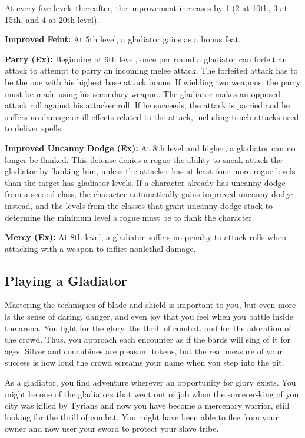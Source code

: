 At every five levels thereafter, the improvement increases by 1 (2 at 10th, 3 at 15th, and 4 at 20th level).

\textbf{Improved Feint:} At 5th level, a gladiator gains  as a bonus feat.

\textbf{Parry (Ex):} Beginning at 6th level, once per round a gladiator can forfeit an attack to attempt to parry an incoming melee attack. The forfeited attack has to be the one with his highest base attack bonus. If wielding two weapons, the parry must be made using his secondary weapon. The gladiator makes an opposed attack roll against his attacker roll. If he succeeds, the attack is parried and he suffers no damage or ill effects related to the attack, including touch attacks used to deliver spells.

\textbf{Improved Uncanny Dodge (Ex):} At 8th level and higher, a gladiator can no longer be flanked. This defense denies a rogue the ability to sneak attack the gladiator by flanking him, unless the attacker has at least four more rogue levels than the target has gladiator levels. If a character already has uncanny dodge from a second class, the character automatically gains improved uncanny dodge instead, and the levels from the classes that grant uncanny dodge stack to determine the minimum level a rogue must be to flank the character.

\textbf{Mercy (Ex):} At 8th level, a gladiator suffers no penalty to attack rolls when attacking with a weapon to inflict nonlethal damage.

\subsection{Playing a Gladiator}
Mastering the techniques of blade and shield is important to you, but even more is the sense of daring, danger, and even joy that you feel when you battle inside the arena. You fight for the glory, the thrill of combat, and for the adoration of the crowd. Thus, you approach each encounter as if the bards will sing of it for ages. Silver and concubines are pleasant tokens, but the real measure of your success is how loud the crowd screams your name when you step into the pit.

As a gladiator, you find adventure wherever an opportunity for glory exists. You might be one of the gladiators that went out of job when the sorcerer-king of you city was killed by Tyrians and now you have become a mercenary warrior, still looking for the thrill of combat. You might have been able to flee from your owner and now user your sword to protect your slave tribe.


